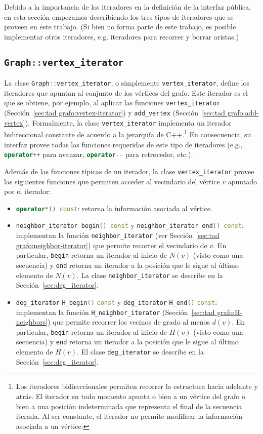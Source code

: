 \documentclass[%
    a4paper,%
    fontsize=12pt,%
    DIV=12,
    twoside,%
    openright,%
    titlepage=true,%
    headsepline,%
    toc=bibliography,%
    parskip=half,%
    cleardoublepage=empty,%
    headings=big,%
]{scrbook}
\makeatletter
\newcommand{\Code}[2][]{\lstinline[basicstyle={\ttfamily},#1]@#2@}
\newcommand{\CPPCode}[2][]{\lstinline[language=C++,basicstyle={\ttfamily},#1]@#2@}
\DeclareRobustCommand{\CPP}{C\nolinebreak[4]\hspace{-.05em}\raisebox{.4ex}{\relsize{-3}\textbf{++}}\xspace}
\def\CPP{C++}%
\makeatother
\begin{document}
Debido a la importancia de los iteradores en la definición de la interfaz pública, en esta sección empezamos describiendo los tres tipos de iteradores que se proveen en este trabajo.  (Si bien no forma parte de este trabajo, es posible implementar otros iteradores, e.g. iteradores para recorrer y borrar aristas.)

\def\lstlistingname{Código}
\subsection{\texorpdfstring{\protect\CPPCode{Graph::vertex_iterator}}{Graph::vertex\_iterator}}
\label{sec:vertex iterator}

La clase \CPPCode{Graph::vertex_iterator}, o simplemente \CPPCode{vertex_iterator}, define los iteradores que apuntan al conjunto de los vértices del grafo.  Este iterador es el que se obtiene, por ejemplo, al aplicar las funciones \Code{vertex_iterator} (Sección~\ref{sec:tad grafo:vertex-iterator}) y \Code{add_vertex} (Sección~\ref{sec:tad grafo:add-vertex}).  Formalmente, la clase \CPPCode{vertex_iterator} implementa un iterador bidireccional constante de acuerdo a la jerarquía de \CPP.\footnote{Los iteradores bidireccionales permiten recorrer la estructura hacia adelante y atrás.  El iterador en todo momento apunta o bien a un vértice del grafo o bien a una posición indeterminada que representa el final de la secuencia iterada.  Al ser constante, el iterador no permite modificar la información asociada a un vértice.}  En consecuencia, su interfaz provee todas las funciones requeridas de este tipo de iteradores (e.g., \CPPCode{operator++} para avanzar, \CPPCode{operator--} para retroceder, etc.).  

Además de las funciones típicas de un iterador, la clase \CPPCode{vertex_iterator} provee las siguientes funciones que permiten acceder al vecindario del vértice $v$ apuntado por el iterador:
\begin{itemize}
 \item \CPPCode{operator*() const}: retorna la información asociada al vértice.
 \item \CPPCode{neighbor_iterator begin() const} y \CPPCode{neighbor_iterator end() const}: implementan la función \Code{neighbor_iterator} (ver Sección~\ref{sec:tad grafo:neighbor-iterator}) que permite recorrer el vecindario de $v$.  En particular, \CPPCode{begin} retorna un iterador al inicio de $N(v)$ (visto como una secuencia) y \CPPCode{end} retorna un iterador a la posición que le sigue al último elemento de $N(v)$.  La clase \CPPCode{neighbor_iterator} se describe en la Sección~\ref{sec:deg_iterator}. 
 \item \CPPCode{deg_iterator} \CPPCode{H_begin()} \CPPCode{const} y \CPPCode{deg_iterator} \CPPCode{H_end()} \CPPCode{const}: implementan la función \Code{H_neighbor_iterator} (Sección~\ref{sec:tad grafo:H-neighbors}) que permite recorrer los vecinos de grado al menos $d(v)$.  En particular, \CPPCode{begin} retorna un iterador al inicio de $H(v)$ (visto como una secuencia) y \CPPCode{end} retorna un iterador a la posición que le sigue al último elemento de $H(v)$.  El clase \CPPCode{deg_iterator} se describe en la Sección~\ref{sec:deg_iterator}. 
\end{itemize}
\end{document}
